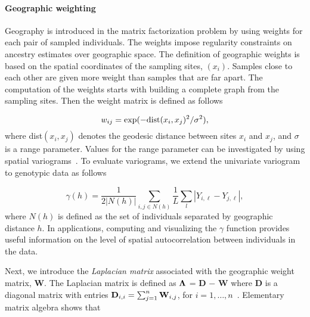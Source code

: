  \paragraph{Geographic weighting} Geography is introduced in the matrix factorization problem by using weights for each pair of sampled individuals. The weights impose regularity constraints on ancestry estimates over geographic space. The definition of geographic weights is based on the spatial coordinates of the sampling sites, $(x_i)$. Samples close to each other are given more weight than samples that are far apart. The computation of the weights starts with building a complete graph from the sampling sites. Then the weight matrix is defined as follows

$$
w_{ij} = \exp( - {\rm dist}( x_i, x_j )^2/ \sigma^2),
$$
\noindent where dist$( x_i, x_j )$ denotes the geodesic distance between sites $x_i$ and  $x_j$, and $\sigma$ is a range parameter. Values for the range parameter can be investigated by using spatial variograms~\citep{Cressie1993}. 
To evaluate variograms, we extend the univariate variogram to genotypic data as follows

\begin{equation}
\gamma(h) = \frac{1}{2 |N(h)|} \sum_{i,j \in N(h)} \frac{1}{L} \sum_{l} |Y_{i,\ell} - Y_{j,\ell}|,
\label{eq:gamma}
\end{equation}
\noindent where $N(h)$ is defined as the set of individuals separated by geographic distance $h$. 
In applications, computing and visualizing the $\gamma$ function  provides useful information on the level of spatial autocorrelation between individuals in the data. 


Next, we introduce the {\it Laplacian matrix} associated with the geographic weight matrix, {\bf W}. The Laplacian matrix is defined as ${\bf \Lambda}$ = {\bf D} $-$ {\bf W}  where  {\bf D} is a diagonal matrix with entries
${\bf D}_{i,i} = \sum_{j = 1}^n  {\bf W}_{i,j}$,  for  $i = 1, \dots, n$~\citep{Belkin2003}. Elementary matrix algebra shows that~\citep{DengCai2011}

